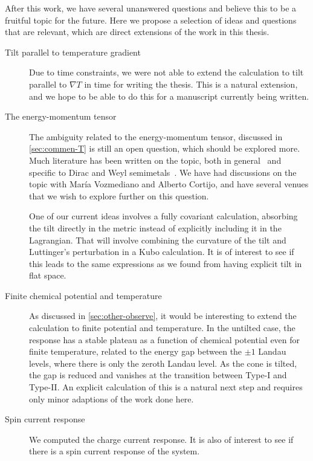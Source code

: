After this work, we have several unanswered questions and believe this to be a fruitful topic for the future.
Here we propose a selection of ideas and questions that are relevant, which are direct extensions of the work in this thesis.
\begin{description}
  \item[Tilt parallel to temperature gradient]
        Due to time constraints, we were not able to extend the calculation to tilt parallel to \( \nabla T \) in time for writing the thesis.
        This is a natural extension, and we hope to be able to do this for a manuscript currently being written.

  \item[The energy-momentum tensor]
        The ambiguity related to the energy\hyp{}momentum tensor, discussed in \cref{sec:commen-T} is still an open question, which should be explored more.
        Much literature has been written on the topic, both in general~\cite{forgerCurrentsEnergyMomentumTensor2004} and specific to Dirac and Weyl semimetals~\cite{vanderwurffMagnetovorticalThermoelectricTransport2019,arjonaFingerprintsConformalAnomaly2019}.
        We have had discussions on the topic with María Vozmediano and Alberto Cortijo, and have several venues that we wish to explore further on this question.

        One of our current ideas involves a fully covariant calculation, absorbing the tilt directly in the metric instead of explicitly including it in the Lagrangian.
        That will involve combining the curvature of the tilt and Luttinger's perturbation in a Kubo calculation.
        It is of interest to see if this leads to the same expressions as we found from having explicit tilt in flat space.


  \item[Finite chemical potential and temperature]
        As discussed in \cref{sec:other-observe}, it would be interesting to extend the calculation to finite potential and temperature.
        In the untilted case, the response has a stable plateau as a function of chemical potential even for finite temperature, related to the energy gap between the \( \pm 1 \) Landau levels, where there is only the zeroth Landau level.
        As the cone is tilted, the gap is reduced and vanishes at the transition between Type-I and Type-II.
        An explicit calculation of this is a natural next step and requires only minor adaptions of the work done here.

  \item[Spin current response] We computed the charge current response.
        It is also of interest to see if there is a spin current response of the system.

\end{description}

